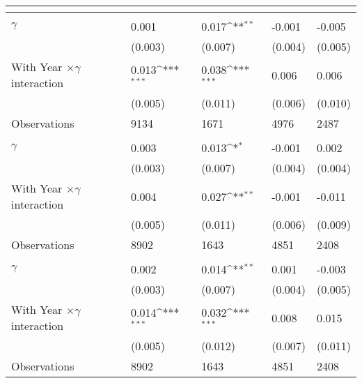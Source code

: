 {
\def\sym#1{\ifmmode^{#1}\else\(^{#1}\)\fi}
\begin{tabularx}{0.85\linewidth}{l *{4}{Y}}
\toprule
                 & &  &  &  \\
\midrule
\addlinespace
{} \\
\addlinespace
$\gamma$    &    0.001   &    0.017\sym{**} &   -0.001   &   -0.005  \\
            &  (0.003)  &  (0.007)   &  (0.004)  &  (0.005)  \\
\addlinespace
With Year $\times\gamma$ interaction & 0.013\sym{***}  &  0.038\sym{***} & 0.006 &  0.006 \\
		 &  (0.005) &  (0.011)  &  (0.006)  &  (0.010) \\
       
\midrule
Observations    &     9134         &     1671 &     4976 &     2487         \\

\midrule
\addlinespace
{} \\
\addlinespace
$\gamma$        &    0.003     &    0.013\sym{*} &   -0.001  &    0.002  \\
                &  (0.003)  &  (0.007)       &  (0.004)          &  (0.004)      \\
\addlinespace
With Year $\times\gamma$ interaction &  0.004  &  0.027\sym{**} &   -0.001   &   -0.011   \\
    &  (0.005)         &  (0.011)           &  (0.006)          &  (0.009)        \\ 
\midrule
Observations    &    8902       &     1643   &     4851 &     2408         \\

\midrule
\addlinespace
{} \\
\addlinespace
$\gamma$        &    0.002  &  0.014\sym{**}&    0.001     &   -0.003      \\
                &  (0.003)  &  (0.007)    &  (0.004)     &  (0.005)         \\
\addlinespace
 With Year $\times\gamma$ interaction & 0.014\sym{***}  & 0.032\sym{***}  &    0.008   & 0.015   \\
         &  (0.005)         &  (0.012)     &  (0.007)  &  (0.011)    \\
\midrule
Observations    &     8902    &     1643   &     4851     &     2408         \\


\end{tabularx}}
